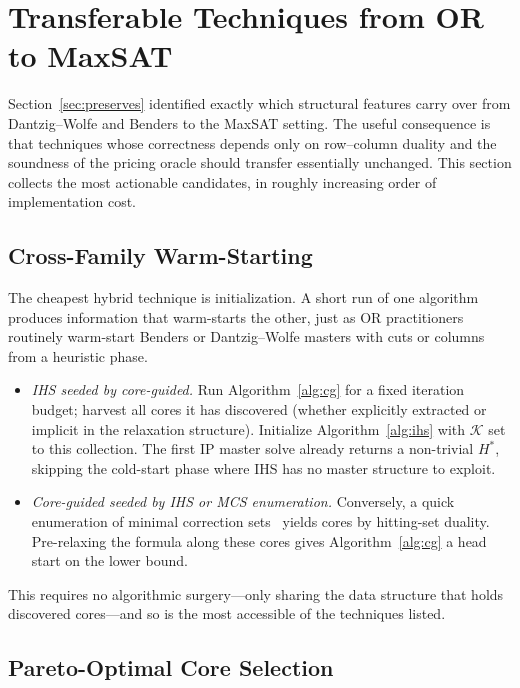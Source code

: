 \documentclass[11pt,a4paper]{article}
\begin{document}
\section{Transferable Techniques from OR to MaxSAT}
\label{sec:techniques}

Section~\ref{sec:preserves} identified exactly which structural features carry
over from Dantzig--Wolfe and Benders to the MaxSAT setting. The useful
consequence is that techniques whose correctness depends only on row--column
duality and the soundness of the pricing oracle should transfer essentially
unchanged. This section collects the most actionable candidates, in roughly
increasing order of implementation cost.

\subsection{Cross-Family Warm-Starting}

The cheapest hybrid technique is initialization. A short run of one algorithm
produces information that warm-starts the other, just as OR practitioners
routinely warm-start Benders or Dantzig--Wolfe masters with cuts or columns
from a heuristic phase.

\begin{itemize}
\item \emph{IHS seeded by core-guided.} Run Algorithm~\ref{alg:cg} for a fixed
iteration budget; harvest all cores it has discovered (whether explicitly
extracted or implicit in the relaxation structure). Initialize
Algorithm~\ref{alg:ihs} with $\mathcal{K}$ set to this collection. The first
IP master solve already returns a non-trivial $H^*$, skipping the cold-start
phase where IHS has no master structure to exploit.
\item \emph{Core-guided seeded by IHS or MCS enumeration.} Conversely, a quick
enumeration of minimal correction sets~\citep{liffiton2008algorithms} yields
cores by hitting-set duality. Pre-relaxing the formula along these cores gives
Algorithm~\ref{alg:cg} a head start on the lower bound.
\end{itemize}

This requires no algorithmic surgery---only sharing the data structure that
holds discovered cores---and so is the most accessible of the techniques
listed.

\subsection{Pareto-Optimal Core Selection}
\end{document}
